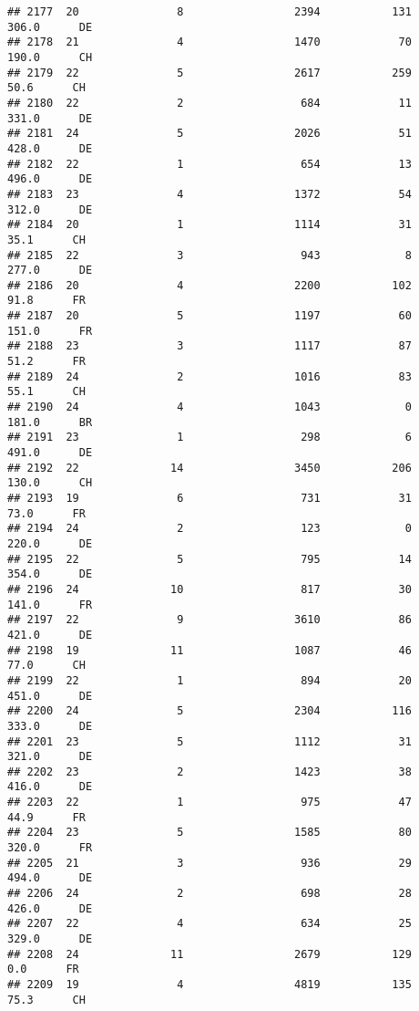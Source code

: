 \documentclass[
]{article}
\begin{document}
\begin{verbatim}
## 2177  20               8                 2394           131    306.0      DE
## 2178  21               4                 1470            70    190.0      CH
## 2179  22               5                 2617           259     50.6      CH
## 2180  22               2                  684            11    331.0      DE
## 2181  24               5                 2026            51    428.0      DE
## 2182  22               1                  654            13    496.0      DE
## 2183  23               4                 1372            54    312.0      DE
## 2184  20               1                 1114            31     35.1      CH
## 2185  22               3                  943             8    277.0      DE
## 2186  20               4                 2200           102     91.8      FR
## 2187  20               5                 1197            60    151.0      FR
## 2188  23               3                 1117            87     51.2      FR
## 2189  24               2                 1016            83     55.1      CH
## 2190  24               4                 1043             0    181.0      BR
## 2191  23               1                  298             6    491.0      DE
## 2192  22              14                 3450           206    130.0      CH
## 2193  19               6                  731            31     73.0      FR
## 2194  24               2                  123             0    220.0      DE
## 2195  22               5                  795            14    354.0      DE
## 2196  24              10                  817            30    141.0      FR
## 2197  22               9                 3610            86    421.0      DE
## 2198  19              11                 1087            46     77.0      CH
## 2199  22               1                  894            20    451.0      DE
## 2200  24               5                 2304           116    333.0      DE
## 2201  23               5                 1112            31    321.0      DE
## 2202  23               2                 1423            38    416.0      DE
## 2203  22               1                  975            47     44.9      FR
## 2204  23               5                 1585            80    320.0      FR
## 2205  21               3                  936            29    494.0      DE
## 2206  24               2                  698            28    426.0      DE
## 2207  22               4                  634            25    329.0      DE
## 2208  24              11                 2679           129      0.0      FR
## 2209  19               4                 4819           135     75.3      CH

\end{verbatim}
\end{document}

